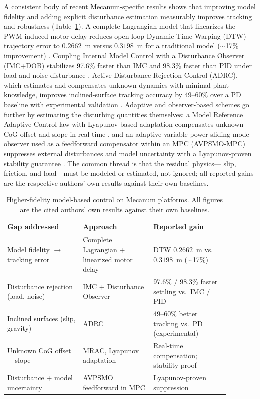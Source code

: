 \documentclass[11pt]{article}
\begin{document}
A consistent body of recent Mecanum-specific results shows that improving model
fidelity and adding explicit disturbance estimation measurably improves tracking
and robustness (Table~\ref{tab:control}). A complete Lagrangian model that
linearizes the PWM-induced motor delay reduces open-loop Dynamic-Time-Warping
(DTW) trajectory error to $0.2662$~m versus $0.3198$~m for a traditional model
($\sim$17\% improvement) \cite{li2025mecanumdob}. Coupling Internal Model Control
with a Disturbance Observer (IMC+DOB) stabilizes 97.6\% faster than IMC and 98.3\%
faster than PID under load and noise disturbance \cite{li2025mecanumdob}. Active
Disturbance Rejection Control (ADRC), which estimates and compensates unknown
dynamics with minimal plant knowledge, improves inclined-surface tracking accuracy
by 49--60\% over a PD baseline with experimental validation
\cite{hernandez2025inclined}. Adaptive and observer-based schemes go further by
estimating the disturbing quantities themselves: a Model Reference Adaptive Control
law with Lyapunov-based adaptation compensates unknown CoG offset and slope in real
time \cite{chaichumporn2025adaptive}, and an adaptive variable-power sliding-mode
observer used as a feedforward compensator within an MPC (AVPSMO-MPC) suppresses
external disturbances and model uncertainty with a Lyapunov-proven stability
guarantee \cite{avpsmo2024}. The common thread is that the residual physics---
slip, friction, and load---must be modeled or estimated, not ignored; all reported
gains are the respective authors' own results against their own baselines.

\begin{table}[t]
  \centering
  \small
  \renewcommand{\arraystretch}{1.25}
  \begin{tabular}{@{}p{0.30\linewidth}p{0.28\linewidth}p{0.30\linewidth}@{}}
    \toprule
    \textbf{Gap addressed} & \textbf{Approach} & \textbf{Reported gain} \\
    \midrule
    Model fidelity $\rightarrow$ tracking error
      & Complete Lagrangian + linearized motor delay \cite{li2025mecanumdob}
      & DTW $0.2662$~m vs.\ $0.3198$~m ($\sim$17\%) \\
    Disturbance rejection (load, noise)
      & IMC + Disturbance Observer \cite{li2025mecanumdob}
      & 97.6\% / 98.3\% faster settling vs.\ IMC / PID \\
    Inclined surfaces (slip, gravity)
      & ADRC \cite{hernandez2025inclined}
      & 49--60\% better tracking vs.\ PD (experimental) \\
    Unknown CoG offset + slope
      & MRAC, Lyapunov adaptation \cite{chaichumporn2025adaptive}
      & Real-time compensation; stability proof \\
    Disturbance + model uncertainty
      & AVPSMO feedforward in MPC \cite{avpsmo2024}
      & Lyapunov-proven suppression \\
    \bottomrule
  \end{tabular}
  \caption{Higher-fidelity model-based control on Mecanum platforms. All figures
  are the cited authors' own results against their own baselines.}
  \label{tab:control}
\end{table}
\end{document}
